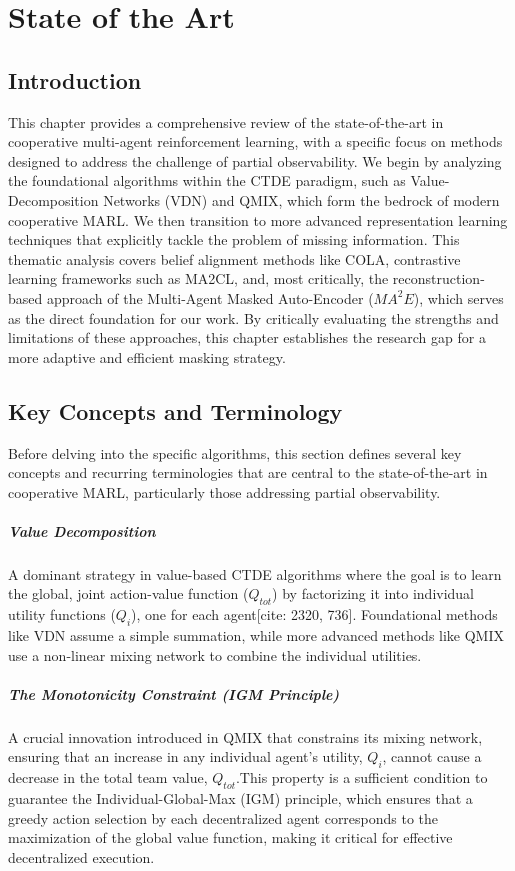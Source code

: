 \chapter{State of the Art}
\label{chap:sota}  

\section*{Introduction}
This chapter provides a comprehensive review of the state-of-the-art in cooperative multi-agent reinforcement learning, with a specific focus on methods designed to address the challenge of partial observability. We begin by analyzing the foundational algorithms within the CTDE paradigm, such as Value-Decomposition Networks (VDN) and QMIX, which form the bedrock of modern cooperative MARL. We then transition to more advanced representation learning techniques that explicitly tackle the problem of missing information. This thematic analysis covers belief alignment methods like COLA, contrastive learning frameworks such as MA2CL, and, most critically, the reconstruction-based approach of the Multi-Agent Masked Auto-Encoder (${MA}^2E$), which serves as the direct foundation for our work. By critically evaluating the strengths and limitations of these approaches, this chapter establishes the research gap for a more adaptive and efficient masking strategy.

\section{Key Concepts and Terminology}

Before delving into the specific algorithms, this section defines several key concepts and recurring terminologies that are central to the state-of-the-art in cooperative MARL, particularly those addressing partial observability.

\paragraph{Value Decomposition}
A dominant strategy in value-based CTDE algorithms where the goal is to learn the global, joint action-value function ($Q_{tot}$) by factorizing it into individual utility functions ($Q_i$), one for each agent[cite: 2320, 736]. Foundational methods like VDN assume a simple summation, while more advanced methods like QMIX use a non-linear mixing network to combine the individual utilities.

\paragraph{The Monotonicity Constraint (IGM Principle)}
A crucial innovation introduced in QMIX that constrains its mixing network, ensuring that an increase in any individual agent's utility, $Q_i$, cannot cause a decrease in the total team value, $Q_{tot}$.This property is a sufficient condition to guarantee the Individual-Global-Max (IGM) principle, which ensures that a greedy action selection by each decentralized agent corresponds to the maximization of the global value function, making it critical for effective decentralized execution.

